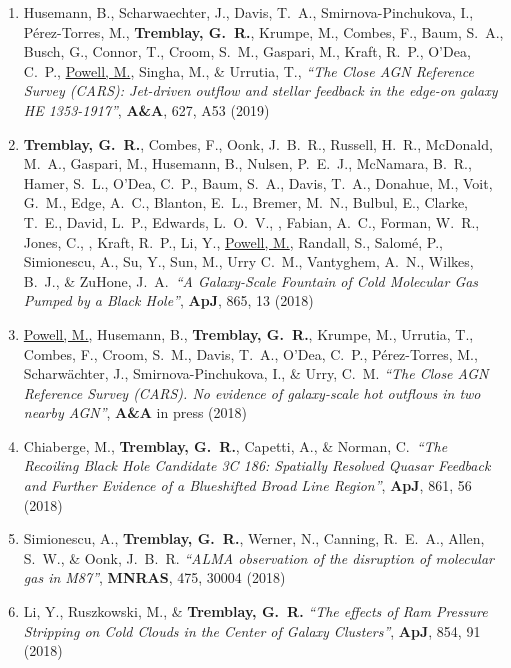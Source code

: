 \documentclass[11pt]{article}
\begin{document}
\begin{enumerate}
\item Husemann, B., Scharwaechter, J., Davis, T.~A., Smirnova-Pinchukova, I., P\'{e}rez-Torres, M., \textbf{Tremblay, G.~R.},
 Krumpe, M., Combes, F., Baum, S.~A., Busch, G., Connor, T.,
 Croom, S.~M., Gaspari, M., Kraft, R.~P., O'Dea, C.~P., \uline{Powell, M.}, Singha, M., \& Urrutia, T., \textit{``The Close AGN Reference Survey (CARS): Jet-driven outflow and stellar feedback in the edge-on galaxy HE 1353-1917''}, \textbf{A\&A}, 627, A53 (2019)

\item \textbf{Tremblay, G.~R.}, Combes, F., Oonk, J.~B.~R., Russell, H.~R., McDonald, M.~A.,
Gaspari, M., Husemann, B., Nulsen, P.~E.~J., McNamara, B.~R., Hamer, S.~L., O'Dea, C.~P.,
Baum, S.~A., Davis, T.~A., Donahue, M., Voit, G.~M., Edge, A.~C., Blanton, E.~L.,
Bremer, M.~N., Bulbul, E., Clarke, T.~E., David, L.~P., Edwards, L.~O.~V., , Fabian, A.~C., Forman, W.~R., Jones, C., , Kraft, R.~P., Li, Y., \uline{Powell, M.},
Randall, S., Salom\'{e}, P., Simionescu, A., Su, Y., Sun, M., Urry C.~M., Vantyghem, A.~N.,
Wilkes, B.~J., \& ZuHone, J.~A.~\textit{``A Galaxy-Scale Fountain of Cold Molecular Gas Pumped by a Black Hole''}, \textbf{ApJ}, 865, 13 (2018)



\item \uline{Powell, M.}, Husemann, B., \textbf{Tremblay, G.~R.}, Krumpe, M.,
Urrutia, T., Combes, F., Croom, S.~M., Davis, T.~A., O'Dea, C.~P., P\'{e}rez-Torres,
M., Scharw\"{a}chter, J., Smirnova-Pinchukova, I., \& Urry, C.~M. \textit{``The Close AGN Reference Survey (CARS). No evidence of galaxy-scale hot outflows in two nearby AGN''}, \textbf{A\&A} in press (2018)


\item Chiaberge, M., \textbf{Tremblay, G.~R.}, Capetti, A., \& Norman, C.~\textit{``The Recoiling Black Hole Candidate 3C 186: Spatially Resolved Quasar Feedback and Further Evidence of a Blueshifted Broad Line Region''},
\textbf{ApJ}, 861, 56 (2018)


\item Simionescu, A., \textbf{Tremblay, G.~R.}, Werner, N., Canning, R.~E.~A., Allen, S.~W., \& Oonk, J.~B.~R.
\textit{``ALMA observation of the disruption of
molecular gas in M87''}, \textbf{MNRAS}, 475, 30004 (2018)


\item Li, Y., Ruszkowski, M., \& \textbf{Tremblay, G.~R.} \textit{``The effects of Ram Pressure Stripping on Cold Clouds in the Center of Galaxy Clusters''}, \textbf{ApJ}, 854, 91 (2018)



\end{enumerate}
\end{document}
